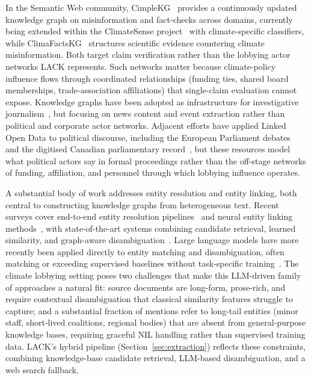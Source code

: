 In the Semantic Web community, CimpleKG~\cite{burel2024cimplekg} provides a continuously updated knowledge graph on misinformation and fact-checks across domains, currently being extended within the ClimateSense project~\cite{climatesense} with climate-specific classifiers, while ClimaFactsKG~\cite{burel2025climafactskg} structures scientific evidence countering climate misinformation. Both target claim verification rather than the lobbying actor networks LACK represents. Such networks matter because climate-policy influence flows through coordinated relationships (funding ties, shared board memberships, trade-association affiliations) that single-claim evaluation cannot expose.
Knowledge graphs have been adopted as infrastructure for investigative journalism~\cite{opdahl2022semantic,gallofre2022jkp,berven2020kg,alexander2023manifesto,motta2025epistemology}, but focusing on news content and event extraction rather than political and corporate actor networks.
Adjacent efforts have applied Linked Open Data to political discourse, including the European Parliament debates~\cite{van2016debates} and the digitised Canadian parliamentary record~\cite{beelen2017digitization}, but these resources model what political actors say in formal proceedings rather than the off-stage networks of funding, affiliation, and personnel through which lobbying influence operates.


A substantial body of work addresses entity resolution and entity linking, both central to constructing knowledge graphs from heterogeneous text. Recent surveys cover end-to-end entity resolution pipelines~\cite{christophides2020er} and neural entity linking methods~\cite{sevgili2022neural}, with state-of-the-art systems combining candidate retrieval, learned similarity, and graph-aware disambiguation~\cite{ayoola2022refined}. Large language models have more recently been applied directly to entity matching and disambiguation, often matching or exceeding supervised baselines without task-specific training~\cite{peeters2025llmem}. The climate lobbying setting poses two challenges that make this LLM-driven family of approaches a natural fit: source documents are long-form, prose-rich, and require contextual disambiguation that classical similarity features struggle to capture; and a substantial fraction of mentions refer to long-tail entities (minor staff, short-lived coalitions, regional bodies) that are absent from general-purpose knowledge bases, requiring graceful NIL handling rather than supervised training data. LACK's hybrid pipeline (Section~\ref{sec:extraction}) reflects these constraints, combining knowledge-base candidate retrieval, LLM-based disambiguation, and a web search fallback.


